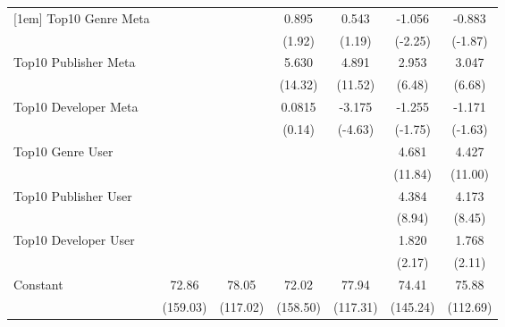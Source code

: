 \documentclass{article}
\begin{document}
\begin{table}[htbp]
\begin{tabular}{l*{6}{c}}
[1em]
Top10 Genre Meta    &                     &                     &       0.895         &       0.543         &      -1.056\sym{*}  &      -0.883         \\
                    &                     &                     &      (1.92)         &      (1.19)         &     (-2.25)         &     (-1.87)         \\
[1em]
Top10 Publisher Meta&                     &                     &       5.630\sym{***}&       4.891\sym{***}&       2.953\sym{***}&       3.047\sym{***}\\
                    &                     &                     &     (14.32)         &     (11.52)         &      (6.48)         &      (6.68)         \\
[1em]
Top10 Developer Meta&                     &                     &      0.0815         &      -3.175\sym{***}&      -1.255         &      -1.171         \\
                    &                     &                     &      (0.14)         &     (-4.63)         &     (-1.75)         &     (-1.63)         \\
[1em]
Top10 Genre User    &                     &                     &                     &                     &       4.681\sym{***}&       4.427\sym{***}\\
                    &                     &                     &                     &                     &     (11.84)         &     (11.00)         \\
[1em]
Top10 Publisher User&                     &                     &                     &                     &       4.384\sym{***}&       4.173\sym{***}\\
                    &                     &                     &                     &                     &      (8.94)         &      (8.45)         \\
[1em]
Top10 Developer User&                     &                     &                     &                     &       1.820\sym{*}  &       1.768\sym{*}  \\
                    &                     &                     &                     &                     &      (2.17)         &      (2.11)         \\
[1em]
Constant            &       72.86\sym{***}&       78.05\sym{***}&       72.02\sym{***}&       77.94\sym{***}&       74.41\sym{***}&       75.88\sym{***}\\
                    &    (159.03)         &    (117.02)         &    (158.50)         &    (117.31)         &    (145.24)         &    (112.69)         \\

\end{tabular}
\end{table}
\end{document}
